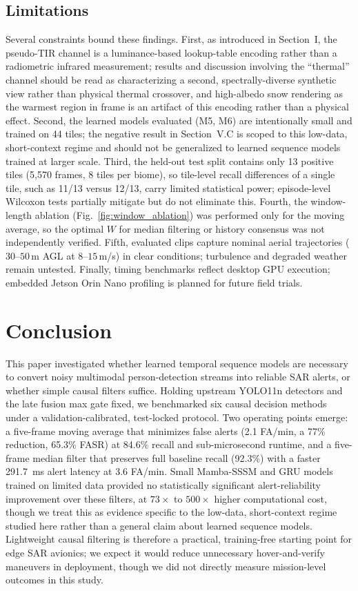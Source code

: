 \documentclass[conference]{IEEEtran}
\begin{document}
\subsection{Limitations}
Several constraints bound these findings. First, as introduced in Section~I, the pseudo-TIR channel is a luminance-based lookup-table encoding rather than a radiometric infrared measurement; results and discussion involving the ``thermal'' channel should be read as characterizing a second, spectrally-diverse synthetic view rather than physical thermal crossover, and high-albedo snow rendering as the warmest region in frame is an artifact of this encoding rather than a physical effect. Second, the learned models evaluated (M5, M6) are intentionally small and trained on 44 tiles; the negative result in Section~V.C is scoped to this low-data, short-context regime and should not be generalized to learned sequence models trained at larger scale. Third, the held-out test split contains only 13 positive tiles (5,570 frames, 8 tiles per biome), so tile-level recall differences of a single tile, such as 11/13 versus 12/13, carry limited statistical power; episode-level Wilcoxon tests partially mitigate but do not eliminate this. Fourth, the window-length ablation (Fig.~\ref{fig:window_ablation}) was performed only for the moving average, so the optimal $W$ for median filtering or history consensus was not independently verified. Fifth, evaluated clips capture nominal aerial trajectories ($30$--$50$\,m AGL at $8$--$15$\,m/s) in clear conditions; turbulence and degraded weather remain untested. Finally, timing benchmarks reflect desktop GPU execution; embedded Jetson Orin Nano profiling is planned for future field trials.

\balance

\section{Conclusion}
This paper investigated whether learned temporal sequence models are necessary to convert noisy multimodal person-detection streams into reliable SAR alerts, or whether simple causal filters suffice. Holding upstream YOLO11n detectors and the late fusion max gate fixed, we benchmarked six causal decision methods under a validation-calibrated, test-locked protocol. Two operating points emerge: a five-frame moving average that minimizes false alerts (2.1 FA/min, a 77\% reduction, 65.3\% FASR) at 84.6\% recall and sub-microsecond runtime, and a five-frame median filter that preserves full baseline recall (92.3\%) with a faster 291.7~ms alert latency at 3.6 FA/min. Small Mamba-SSSM and GRU models trained on limited data provided no statistically significant alert-reliability improvement over these filters, at $73\times$ to $500\times$ higher computational cost, though we treat this as evidence specific to the low-data, short-context regime studied here rather than a general claim about learned sequence models. Lightweight causal filtering is therefore a practical, training-free starting point for edge SAR avionics; we expect it would reduce unnecessary hover-and-verify maneuvers in deployment, though we did not directly measure mission-level outcomes in this study.
\end{document}
